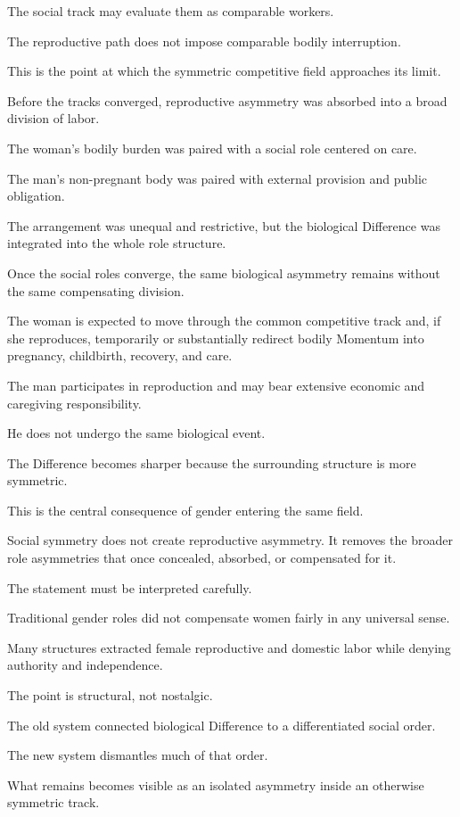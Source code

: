 The social track may evaluate them as comparable workers.

The reproductive path does not impose comparable bodily interruption.

This is the point at which the symmetric competitive field approaches its limit.

Before the tracks converged, reproductive asymmetry was absorbed into a broad division of labor.

The woman’s bodily burden was paired with a social role centered on care.

The man’s non-pregnant body was paired with external provision and public obligation.

The arrangement was unequal and restrictive, but the biological Difference was integrated into the whole role structure.

Once the social roles converge, the same biological asymmetry remains without the same compensating division.

The woman is expected to move through the common competitive track and, if she reproduces, temporarily or substantially redirect bodily Momentum into pregnancy, childbirth, recovery, and care.

The man participates in reproduction and may bear extensive economic and caregiving responsibility.

He does not undergo the same biological event.

The Difference becomes sharper because the surrounding structure is more symmetric.

This is the central consequence of gender entering the same field.

Social symmetry does not create reproductive asymmetry. It removes the broader role asymmetries that once concealed, absorbed, or compensated for it.

The statement must be interpreted carefully.

Traditional gender roles did not compensate women fairly in any universal sense.

Many structures extracted female reproductive and domestic labor while denying authority and independence.

The point is structural, not nostalgic.

The old system connected biological Difference to a differentiated social order.

The new system dismantles much of that order.

What remains becomes visible as an isolated asymmetry inside an otherwise symmetric track.

